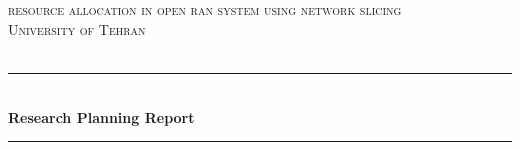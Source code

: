 %


\begin{titlepage}

\newcommand{\HRule}{\rule{\linewidth}{0.5mm}} %
\setlength{\topmargin}{0in}
\center %
 
 
 \begin{minipage}{0.4\textwidth}
\begin{flushleft} \large
\hspace*{-0.5cm}
\end{flushleft}
\end{minipage}
~
\begin{minipage}{0.5\textwidth}
\begin{flushright} \large
\hspace*{2cm}
\end{flushright}
\end{minipage}\\[1cm]

\textsc{\Large resource allocation in open ran system using network slicing}\\[0.5cm] %
\LARGE \textsc{University of Tehran} \\[1.5cm] 
\textsc{\large }\\[0.5cm] %


\HRule \\[0.4cm]
{ \huge \bfseries Research Planning Report}\\[0.4cm] %
\HRule \\[1cm]
 

\end{titlepage}
